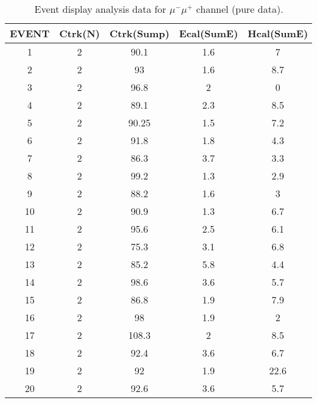 \begin{table}[h!]
    \centering
    \caption{Event display analysis data for $\mu^-\mu^+$ channel (pure data).}
    \begin{tabular}{|ccccc|}
    \hline
    EVENT & Ctrk(N) & Ctrk(Sump) & Ecal(SumE) & Hcal(SumE) \\ \hline
    1     & 2       & 90.1       & 1.6        & 7          \\
    2     & 2       & 93         & 1.6        & 8.7        \\
    3     & 2       & 96.8       & 2          & 0          \\
    4     & 2       & 89.1       & 2.3        & 8.5        \\
    5     & 2       & 90.25      & 1.5        & 7.2        \\
    6     & 2       & 91.8       & 1.8        & 4.3        \\
    7     & 2       & 86.3       & 3.7        & 3.3        \\
    8     & 2       & 99.2       & 1.3        & 2.9        \\
    9     & 2       & 88.2       & 1.6        & 3          \\
    10    & 2       & 90.9       & 1.3        & 6.7        \\
    11    & 2       & 95.6       & 2.5        & 6.1        \\
    12    & 2       & 75.3       & 3.1        & 6.8        \\
    13    & 2       & 85.2       & 5.8        & 4.4        \\
    14    & 2       & 98.6       & 3.6        & 5.7        \\
    15    & 2       & 86.8       & 1.9        & 7.9        \\
    16    & 2       & 98         & 1.9        & 2          \\
    17    & 2       & 108.3      & 2          & 8.5        \\
    18    & 2       & 92.4       & 3.6        & 6.7        \\
    19    & 2       & 92         & 1.9        & 22.6       \\
    20    & 2       & 92.6       & 3.6        & 5.7       \\ \hline
    \end{tabular}
    \label{table:ed-mm}
\end{table}
    
